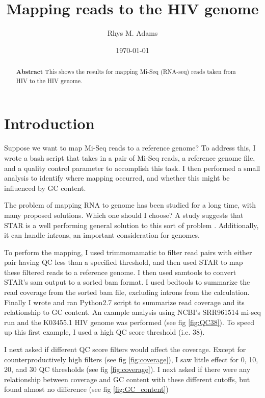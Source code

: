 \documentclass[article]{revtex4}
\begin{document}
\title{Mapping reads to the HIV genome}
\author{Rhys M. Adams}
\date{\today}

\begin{abstract}
\textbf{Abstract}
This shows the results for mapping Mi-Seq (RNA-seq) reads taken from HIV to the HIV genome. 
\end{abstract}

\maketitle

\section{Introduction}
Suppose we want to map Mi-Seq reads to a reference genome? To address this, I wrote a bash script that takes in a pair of Mi-Seq reads, a reference genome file, and a quality control parameter to accomplish this task. I then performed a small analysis to identify where mapping occurred, and whether this might be influenced by GC content.

The problem of mapping RNA to genome has been studied for a long time, with many proposed solutions. Which one should I choose? A study suggests that STAR is a well performing general solution to this sort of problem \cite{engstrom_systematic_2013}. Additionally, it can handle introns, an important consideration for genomes.

To perform the mapping, I used trimmomamatic to filter read pairs with either pair having QC less than a specified threshold, and then used STAR to map these filtered reads to a reference genome. I then used samtools to convert STAR's sam output to a sorted bam format. I used bedtools to summarize the read coverage from the sorted bam file, excluding introns from the calculation. Finally I wrote and ran Python2.7 script to summarize read coverage and its relationship to GC content. An example analysis using NCBI's SRR961514 mi-seq run and the K03455.1 HIV genome was performed (see fig \ref{fig:QC38}). To speed up this first example, I used a high QC score threshold (i.e. 38).

I next asked if different QC score filters would affect the coverage. Except for counterproductively high filters (see fig \ref{fig:coverage}), I saw little effect for 0, 10, 20, and 30 QC thresholds (see fig \ref{fig:coverage}). I next asked if there were any relationship between coverage and GC content with these different cutoffs, but found almost no difference (see fig \ref{fig:GC_content})
\end{document}
